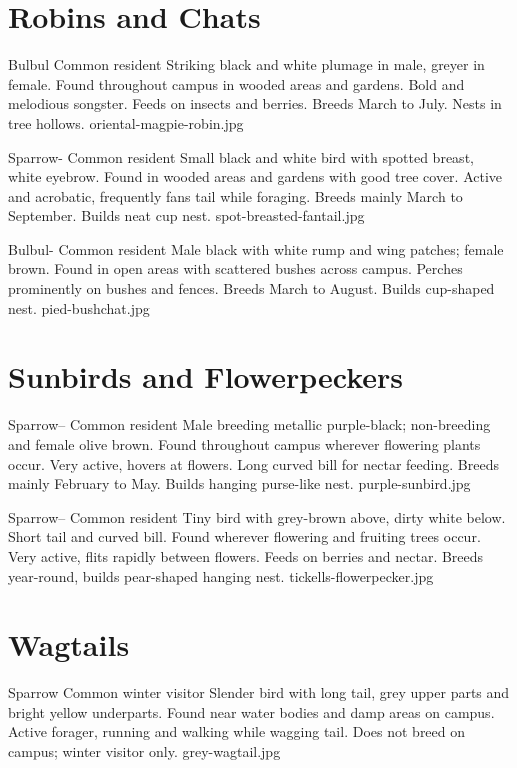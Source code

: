 \documentclass[aspectratio=169]{beamer}
\begin{document}
\section{Robins and Chats}
{Bulbul}
{Common resident}
{Striking black and white plumage in male, greyer in female.}
{Found throughout campus in wooded areas and gardens.}
{Bold and melodious songster. Feeds on insects and berries.}
{Breeds March to July. Nests in tree hollows.}
{oriental-magpie-robin.jpg}

{Sparrow-}
{Common resident}
{Small black and white bird with spotted breast, white eyebrow.}
{Found in wooded areas and gardens with good tree cover.}
{Active and acrobatic, frequently fans tail while foraging.}
{Breeds mainly March to September. Builds neat cup nest.}
{spot-breasted-fantail.jpg}

{Bulbul-}
{Common resident}
{Male black with white rump and wing patches; female brown.}
{Found in open areas with scattered bushes across campus.}
{Perches prominently on bushes and fences.}
{Breeds March to August. Builds cup-shaped nest.}
{pied-bushchat.jpg}

\section{Sunbirds and Flowerpeckers}
{Sparrow--}
{Common resident}
{Male breeding metallic purple-black; non-breeding and female olive brown.}
{Found throughout campus wherever flowering plants occur.}
{Very active, hovers at flowers. Long curved bill for nectar feeding.}
{Breeds mainly February to May. Builds hanging purse-like nest.}
{purple-sunbird.jpg}

{Sparrow--}
{Common resident}
{Tiny bird with grey-brown above, dirty white below. Short tail and curved bill.}
{Found wherever flowering and fruiting trees occur.}
{Very active, flits rapidly between flowers. Feeds on berries and nectar.}
{Breeds year-round, builds pear-shaped hanging nest.}
{tickells-flowerpecker.jpg}

\section{Wagtails}
{Sparrow}
{Common winter visitor}
{Slender bird with long tail, grey upper parts and bright yellow underparts.}
{Found near water bodies and damp areas on campus.}
{Active forager, running and walking while wagging tail.}
{Does not breed on campus; winter visitor only.}
{grey-wagtail.jpg}
\end{document}
